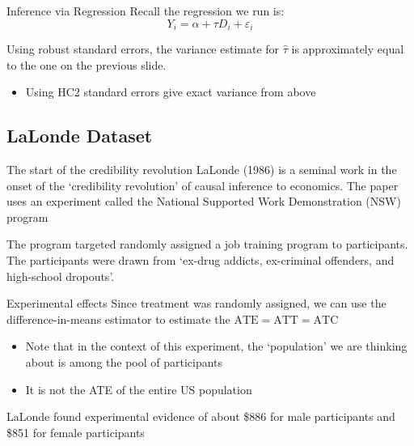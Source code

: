 \documentclass[aspectratio=169,t,11pt,table]{beamer}
\begin{document}
\begin{frame}{Inference via Regression}
  Recall the regression we run is: 
	$$
    Y_i = \alpha + \tau D_i + \varepsilon_i
  $$

	Using robust standard errors, the variance estimate for $\hat{\tau}$ is approximately equal to the one on the previous slide. 
	\begin{itemize}
		\item Using HC2 standard errors give exact variance from above
	\end{itemize}
\end{frame}




\subsection{LaLonde Dataset}

\begin{frame}{The start of the credibility revolution}
  LaLonde (1986) is a seminal work in the onset of the `credibility revolution' of causal inference to economics. The paper uses an experiment called the National Supported Work Demonstration (NSW) program

  \bigskip
  The program targeted randomly assigned a job training program to participants. The participants were drawn from `ex-drug addicts, ex-criminal offenders, and high-school dropouts'. 
\end{frame}

\begin{frame}{Experimental effects}
  Since treatment was randomly assigned, we can use the difference-in-means estimator to estimate the $\text{ATE} = \text{ATT} = \text{ATC}$
  \begin{itemize}
    \item Note that in the context of this experiment, the `population' we are thinking about is among the pool of participants
    \item It is not the ATE of the entire US population
  \end{itemize}
	
	\bigskip
	LaLonde found experimental evidence of about \$886 for male participants and \$851 for female participants
\end{frame}
\end{document}
